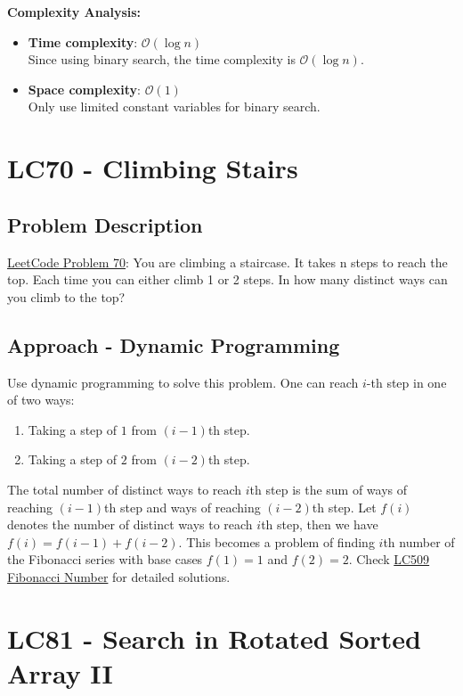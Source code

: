 \documentclass[justified]{tufte-book}
\begin{document}
\noindent \textbf{Complexity Analysis:}
\begin{itemize}
    \item \textbf{Time complexity}: $\mathcal{O}(\log n)$ \\
    Since using binary search, the time complexity is $\mathcal{O}(\log n)$.
    \item \textbf{Space complexity}: $\mathcal{O}(1)$ \\
    Only use limited constant variables for binary search.
\end{itemize}

\section{LC70 - Climbing Stairs} \label{sec:lc70_climb_stair}
\subsection{Problem Description}
\href{https://leetcode.com/problems/climbing-stairs/}{LeetCode Problem 70}: You are climbing a staircase. It takes n steps to reach the top. Each time you can either climb 1 or 2 steps. In how many distinct ways can you climb to the top? 

\subsection{Approach - Dynamic Programming}
Use dynamic programming to solve this problem. One can reach $i$-th step in one of two ways:
\begin{enumerate}
    \item Taking a step of $1$ from $(i-1)$th step.
    \item Taking a step of $2$ from $(i-2)$th step.
\end{enumerate}
The total number of distinct ways to reach $i$th step is the sum of ways of reaching $(i-1)$th step and ways of reaching $(i-2)$th step. Let $f(i)$ denotes the number of distinct ways to reach $i$th step, then we have $f(i) = f(i-1) + f(i-2)$. This becomes a problem of finding $i$th number of the Fibonacci series with base cases $f(1) = 1$ and $f(2) = 2$. Check \hyperref[sec:lc509_fibonacci]{LC509 Fibonacci Number} for detailed solutions.

\section{LC81 - Search in Rotated Sorted Array II} \label{sec:lc81_search_rotated_sorted_array_ii}
\end{document}
